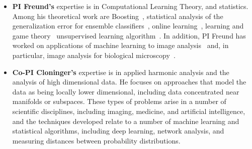 \documentclass{article}
\begin{document}
\begin{itemize}
\item {\bf PI Freund's} expertise is in Computational Learning Theory,
  and statistics. Among his theoretical work are Boosting~\cite{},
  statistical analysis of the generalization error for ensemble
  classifiers~\cite{}, online learning~\cite{}, learning and game
  theory~\cite{} unsupervised learning algorithm~\cite{}.  In
  addition, PI Freund has worked on applications of machine learning
  to image analysis~{} and, in particular, image analysis for
  biological microscopy~\cite{}.
\item {\bf Co-PI Cloninger's} expertise is in applied harmonic
  analysis and the analysis of high dimensional data.  He focuses on
  approaches that model the data as being locally lower dimensional,
  including data concentrated near manifolds or subspaces.  These
  types of problems arise in a number of scientific disciplines,
  including imaging, medicine, and artificial intelligence, and the
  techniques developed relate to a number of machine learning and
  statistical algorithms, including deep learning, network analysis,
  and measuring distances between probability distributions.


\end{itemize}
\end{document}
